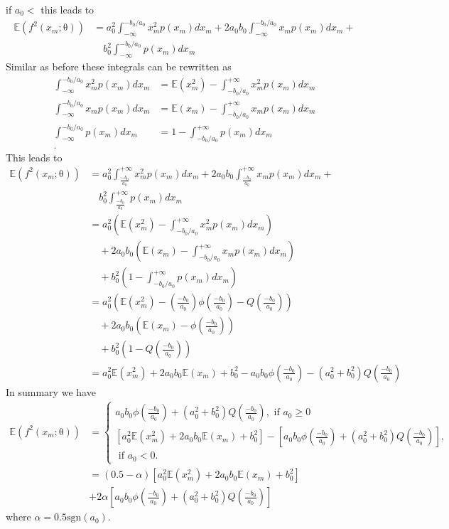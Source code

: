 \documentclass[12pt]{article}
\newcommand{\vect}[1]{\boldsymbol{\mathrm{#1}}}
\newcommand{\expt}[1]{\mathbb{E}\left(#1\right)}
\theoremstyle{remark}
\begin{document}
if $a_0<$ this leads to 
\begin{align*}
	\expt{f^2(x_m; \vect{\theta})}	&=  a_0^2 \int_{-\infty}^{-b_0/a_0} x_m^2 p(x_m) dx_m +2 a_0 b_0 \int_{-\infty}^{-b_0/a_0} x_m p(x_m) dx_m +\\ & \quad b_0^2 \int_{-\infty}^{-b_0/a_0} p(x_m) dx_m 
\end{align*}
Similar as before these integrals can be rewritten as 
\begin{align}
	\int_{-\infty}^{-b_0/a_0} x_m^2 p(x_m) dx_m &= \expt{x_m^2} - \int_{-b_0/a_0}^{+\infty} x_m^2 p(x_m) dx_m \\
	\int_{-\infty}^{-b_0/a_0} x_m p(x_m) dx_m &= \expt{x_m} - \int_{-b_0/a_0}^{+\infty} x_m p(x_m) dx_m \\
	\int_{-\infty}^{-b_0/a_0} p(x_m) dx_m &= 1 - \int_{-b_0/a_0}^{+\infty} p(x_m) dx_m \\.
\end{align}
This leads to 
\begin{align*}
	\expt{f^2(x_m; \vect{\theta})}	&=  a_0^2 \int_{\frac{-b_0}{a_0}}^{+\infty} x_m^2 p(x_m) dx_m +2 a_0 b_0 \int_{\frac{-b_0}{a_0}}^{+\infty} x_m p(x_m) dx_m +\\ & \quad b_0^2 \int_{\frac{-b_0}{a_0}}^{+\infty} p(x_m) dx_m \\
	&=  a_0^2 \left(\expt{x_m^2} - \int_{-b_0/a_0}^{+\infty} x_m^2 p(x_m) dx_m \right) \\ & \quad +2 a_0 b_0 \left(\expt{x_m} - \int_{-b_0/a_0}^{+\infty} x_m p(x_m) dx_m\right) \\ & \quad + b_0^2 \left(1 - \int_{-b_0/a_0}^{+\infty} p(x_m) dx_m\right) \\
	&= a_0^2 \left(\expt{x_m^2} - \left(\frac{-b_0}{a_0}\right) \phi\left(\frac{-b_0}{a_0}\right) - Q\left(\frac{-b_0}{a_0}\right) \right) \\ & \quad +2 a_0 b_0 \left(\expt{x_m} - \phi\left(\frac{-b_0}{a_0}\right)\right) \\ & \quad + b_0^2 \left(1 - Q\left(\frac{-b_0}{a_0}\right)\right) \\
	&= a_0^2 \expt{x_m^2} + 2a_0b_0 \expt{x_m} + b_0^2 - a_0b_0\phi\left(\frac{-b_0}{a_0}\right) - (a_0^2 + b_0^2) Q\left(\frac{-b_0}{a_0}\right) 
\end{align*}
In summary we have
\begin{align}
	\expt{f^2(x_m; \vect{\theta})}	&= \begin{cases}
		a_0b_0 \phi\left(\frac{-b_0}{a_0}\right) + (a_0^2 + b_0^2) Q\left(\frac{-b_0}{a_0}\right), \text{ if } a_0 \geq 0\\
		\left[a_0^2 \expt{x_m^2} + 2a_0b_0 \expt{x_m} + b_0^2\right] - \left[a_0b_0\phi\left(\frac{-b_0}{a_0}\right) + (a_0^2 + b_0^2) Q\left(\frac{-b_0}{a_0}\right)\right], \\
		\text{ if } a_0 < 0. 
	\end{cases}\\
	&= (0.5 - \alpha) \left[a_0^2 \expt{x_m^2} + 2a_0b_0 \expt{x_m} + b_0^2\right] \\
	&+ 2\alpha \left[a_0b_0\phi\left(\frac{-b_0}{a_0}\right) + (a_0^2 + b_0^2) Q\left(\frac{-b_0}{a_0}\right)\right]
\end{align}
where $\alpha = 0.5 \mathrm{sgn}(a_0)$.
\end{document}
